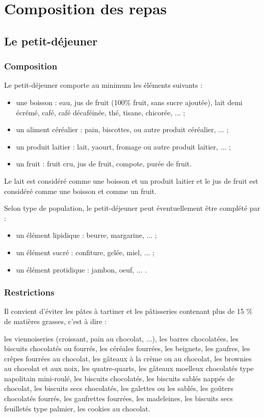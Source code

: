 \chapter{Composition des repas}

\section{Le petit-déjeuner}

\subsection{Composition}

Le petit-déjeuner comporte au minimum les éléments suivants :
\begin{itemize}
	\item une boisson : eau, jus de fruit (100\% fruit, sans sucre ajoutée), lait demi écrémé, café, café décaféinée, thé, tisane, chicorée, ... ;
	\item un aliment céréalier : pain, biscottes, ou autre produit céréalier, ... ;
	\item un produit laitier : lait, yaourt, fromage ou autre produit laitier, ... ;
	\item un fruit : fruit cru, jus de fruit, compote, purée de fruit.
\end{itemize}

Le lait est considéré comme une boisson et un produit laitier et le jus de fruit est considéré comme une boisson et comme un fruit.

Selon type de population, le petit-déjeuner peut éventuellement être complété par :
\begin{itemize}
	\item un élément lipidique  : beurre, margarine, ... ;
	\item un élément sucré : confiture, gelée, miel, ... ;
	\item un élément protidique : jambon, oeuf, ... .
\end{itemize}

\subsection{Restrictions}

Il convient d'éviter les pâtes à tartiner et les pâtisseries contenant plus de 15 \% de matières grasses, c'est à dire :

les viennoiseries (croissant, pain au chocolat, ...), les barres chocolatées, les biscuits chocolatés ou fourrés, les céréales fourrées, les beignets, les gaufres, les crêpes fourrées au chocolat, les gâteaux à la crème ou au chocolat, les brownies au chocolat et aux noix, les quatre-quarts, les gâteaux moelleux chocolatés type napolitain mini-roulé, les biscuits chocolatés, les biscuits sablés nappés de chocolat, les biscuits secs chocolatés, les galettes ou les sablés, les goûters chocolatés fourrés, les gaufrettes fourrées, les madeleines, les biscuits secs feuilletés type palmier, les cookies au chocolat.

